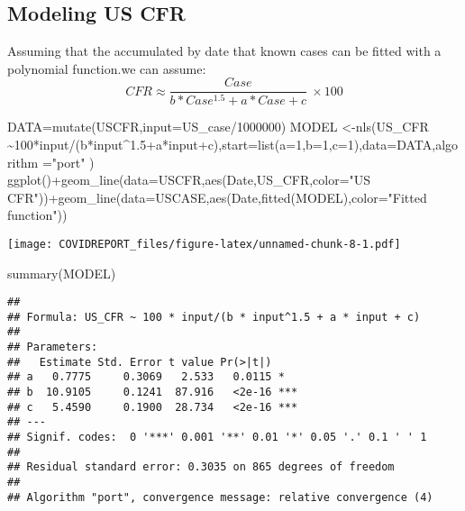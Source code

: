 \documentclass[
]{article}
\newenvironment{Shaded}{\begin{snugshade}}{\end{snugshade}}
\newcommand{\AttributeTok}[1]{\textcolor[rgb]{0.77,0.63,0.00}{#1}}
\newcommand{\DecValTok}[1]{\textcolor[rgb]{0.00,0.00,0.81}{#1}}
\newcommand{\FloatTok}[1]{\textcolor[rgb]{0.00,0.00,0.81}{#1}}
\newcommand{\FunctionTok}[1]{\textcolor[rgb]{0.00,0.00,0.00}{#1}}
\newcommand{\NormalTok}[1]{#1}
\newcommand{\OtherTok}[1]{\textcolor[rgb]{0.56,0.35,0.01}{#1}}
\newcommand{\SpecialCharTok}[1]{\textcolor[rgb]{0.00,0.00,0.00}{#1}}
\newcommand{\StringTok}[1]{\textcolor[rgb]{0.31,0.60,0.02}{#1}}
\begin{document}
\hypertarget{modeling-us-cfr}{%
\subsection{Modeling US CFR}\label{modeling-us-cfr}}

Assuming that the accumulated by date that known cases can be fitted
with a polynomial function.we can assume: \[
CFR\approx\frac{Case}{b*Case^{1.5}+a*Case+c} \ \times 100 
\]

\begin{Shaded}
\begin{Highlighting}[]
\NormalTok{DATA}\OtherTok{=}\FunctionTok{mutate}\NormalTok{(USCFR,}\AttributeTok{input=}\NormalTok{US\_case}\SpecialCharTok{/}\DecValTok{1000000}\NormalTok{)}
\NormalTok{MODEL }\OtherTok{\textless{}{-}}\FunctionTok{nls}\NormalTok{(US\_CFR }\SpecialCharTok{\textasciitilde{}}\DecValTok{100}\SpecialCharTok{*}\NormalTok{input}\SpecialCharTok{/}\NormalTok{(b}\SpecialCharTok{*}\NormalTok{input}\SpecialCharTok{\^{}}\FloatTok{1.5}\SpecialCharTok{+}\NormalTok{a}\SpecialCharTok{*}\NormalTok{input}\SpecialCharTok{+}\NormalTok{c),}\AttributeTok{start=}\FunctionTok{list}\NormalTok{(}\AttributeTok{a=}\DecValTok{1}\NormalTok{,}\AttributeTok{b=}\DecValTok{1}\NormalTok{,}\AttributeTok{c=}\DecValTok{1}\NormalTok{),}\AttributeTok{data=}\NormalTok{DATA,}\AttributeTok{algorithm =}\StringTok{"port"}\NormalTok{ )}
\FunctionTok{ggplot}\NormalTok{()}\SpecialCharTok{+}\FunctionTok{geom\_line}\NormalTok{(}\AttributeTok{data=}\NormalTok{USCFR,}\FunctionTok{aes}\NormalTok{(Date,US\_CFR,}\AttributeTok{color=}\StringTok{"US CFR"}\NormalTok{))}\SpecialCharTok{+}\FunctionTok{geom\_line}\NormalTok{(}\AttributeTok{data=}\NormalTok{USCASE,}\FunctionTok{aes}\NormalTok{(Date,}\FunctionTok{fitted}\NormalTok{(MODEL),}\AttributeTok{color=}\StringTok{"Fitted function"}\NormalTok{))}
\end{Highlighting}
\end{Shaded}

\texttt{[image: COVIDREPORT\_files/figure-latex/unnamed-chunk-8-1.pdf]}

\begin{Shaded}
\begin{Highlighting}[]
\FunctionTok{summary}\NormalTok{(MODEL)}
\end{Highlighting}
\end{Shaded}

\begin{verbatim}
## 
## Formula: US_CFR ~ 100 * input/(b * input^1.5 + a * input + c)
## 
## Parameters:
##   Estimate Std. Error t value Pr(>|t|)    
## a   0.7775     0.3069   2.533   0.0115 *  
## b  10.9105     0.1241  87.916   <2e-16 ***
## c   5.4590     0.1900  28.734   <2e-16 ***
## ---
## Signif. codes:  0 '***' 0.001 '**' 0.01 '*' 0.05 '.' 0.1 ' ' 1
## 
## Residual standard error: 0.3035 on 865 degrees of freedom
## 
## Algorithm "port", convergence message: relative convergence (4)
\end{verbatim}
\end{document}
